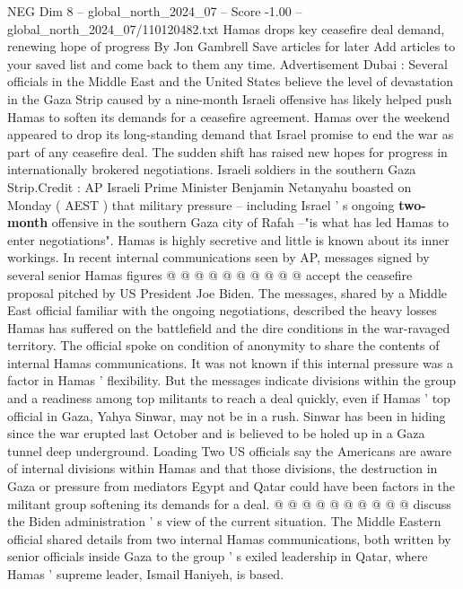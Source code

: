 \begin{textsample}{NEG Dim 8 – global\_north\_2024\_07 – Score -1.00 – global\_north\_2024\_07/110120482.txt}  \label{ex:f8_neg_417}
Hamas drops key ceasefire deal demand, renewing hope of progress By Jon Gambrell Save articles for later Add articles to your saved list and come back to them any time.
Advertisement Dubai : Several officials in the Middle East and the United States believe the level of devastation in the Gaza Strip caused by a nine-month Israeli offensive has likely helped push Hamas to soften its demands for a ceasefire agreement.
Hamas over the weekend appeared to drop its long-standing demand that Israel promise to end the war as part of any ceasefire deal.
The sudden shift has raised new hopes for progress in internationally brokered negotiations.
Israeli soldiers in the southern Gaza Strip.Credit : AP Israeli Prime Minister Benjamin Netanyahu boasted on Monday ( AEST ) that military pressure -- including Israel ' s ongoing \textbf{two-month} offensive in the southern Gaza city of Rafah --"is what has led Hamas to enter negotiations".
Hamas is highly secretive and little is known about its inner workings.
In recent internal communications seen by AP, messages signed by several senior Hamas figures @ @ @ @ @ @ @ @ @ @ accept the ceasefire proposal pitched by US President Joe Biden.
The messages, shared by a Middle East official familiar with the ongoing negotiations, described the heavy losses Hamas has suffered on the battlefield and the dire conditions in the war-ravaged territory.
The official spoke on condition of anonymity to share the contents of internal Hamas communications.
It was not known if this internal pressure was a factor in Hamas ' flexibility.
But the messages indicate divisions within the group and a readiness among top militants to reach a deal quickly, even if Hamas ' top official in Gaza, Yahya Sinwar, may not be in a rush.
Sinwar has been in hiding since the war erupted last October and is believed to be holed up in a Gaza tunnel deep underground.
Loading Two US officials say the Americans are aware of internal divisions within Hamas and that those divisions, the destruction in Gaza or pressure from mediators Egypt and Qatar could have been factors in the militant group softening its demands for a deal. @ @ @ @ @ @ @ @ @ @ discuss the Biden administration ' s view of the current situation.
The Middle Eastern official shared details from two internal Hamas communications, both written by senior officials inside Gaza to the group ' s exiled leadership in Qatar, where Hamas ' supreme leader, Ismail Haniyeh, is based.

\end{textsample}
